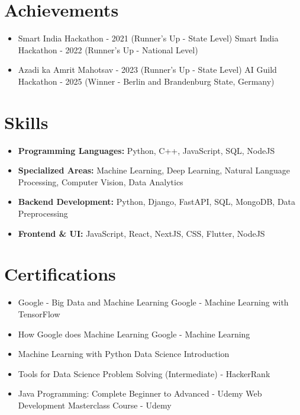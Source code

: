 \documentclass[a4paper,10pt]{article}
\begin{document}
\section*{Achievements}
\begin{itemize}
\item Smart India Hackathon - 2021 (Runner's Up - State Level) \hfill Smart India Hackathon - 2022 (Runner's Up - National Level)
\item Azadi ka Amrit Mahotsav - 2023 (Runner's Up - State Level) \hfill AI Guild Hackathon - 2025 (Winner - Berlin and Brandenburg State, Germany)
\end{itemize}

\section*{Skills}
\begin{itemize}
  \item \textbf{Programming Languages:} Python, C++, JavaScript, SQL, NodeJS
  \item \textbf{Specialized Areas:} Machine Learning, Deep Learning, Natural Language Processing, Computer Vision, Data Analytics
  \item \textbf{Backend Development:} Python, Django, FastAPI, SQL, MongoDB, Data Preprocessing
  \item \textbf{Frontend \& UI:} JavaScript, React, NextJS, CSS, Flutter, NodeJS
\end{itemize}

\section*{Certifications}
\begin{itemize}
\item Google - Big Data and Machine Learning \hfill Google - Machine Learning with TensorFlow
\item How Google does Machine Learning \hfill Google - Machine Learning
\item Machine Learning with Python \hfill Data Science Introduction
\item Tools for Data Science \hfill Problem Solving (Intermediate) - HackerRank
\item Java Programming: Complete Beginner to Advanced - Udemy \hfill Web Development Masterclass Course - Udemy
\end{itemize}
\end{document}

